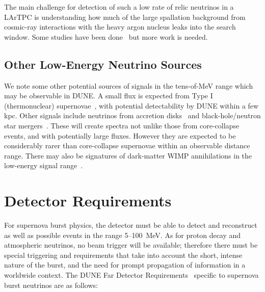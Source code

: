  The main challenge for detection of such
a low rate of relic neutrinos in a LArTPC is understanding how much of
the large spallation background from cosmic-ray interactions with the
heavy argon nucleus 
leaks into the search window.   Some studies have been done~\cite{Barker:2012nb} but more work is needed.

\subsection{Other Low-Energy Neutrino Sources}

We note some other potential sources of signals in the tens-of-MeV
range which may be observable in DUNE.  A small flux is expected from
Type I (thermonuclear) supernovae~\cite{Wright:2016gar,
  Wright:2016xma}, with potential detectability by DUNE within a few
kpc.   Other signals include neutrinos from accretion disks~\cite{Caballero:2011dw} and black-hole/neutron star mergers~\cite{Caballero:2009ww}.  These will create spectra not unlike those from core-collapse events, and with potentially large fluxes.  However they are expected to be considerably rarer than core-collapse supernovae within an observable distance range.  There may also be signatures of dark-matter WIMP annihilations in the low-energy signal range~\cite{Rott:2012qb, Bernal:2012qh}.



\section{Detector Requirements}
\label{sec:physics-snblowe-detector-requirements}

For supernova burst physics, the detector must be able to detect and reconstruct as well as possible events in the range 5--100~MeV.  As for proton decay and atmospheric neutrinos, no beam trigger will be available; therefore there must be special triggering and  requirements that take into account the short, intense nature of the burst, and the need for prompt propagation of information in a worldwide context.
The DUNE Far Detector
Requirements~\cite{lbnfdune-cdr-req} specific to supernova burst neutrinos are as follows:

